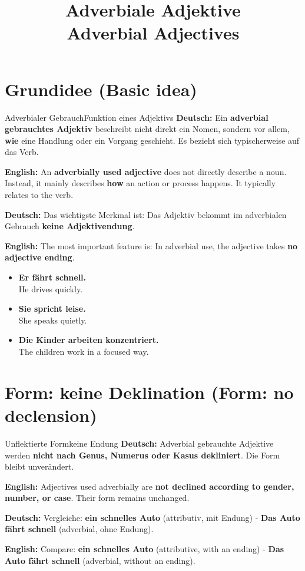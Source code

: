 \documentclass[a4paper,11pt]{article}
\title{Adverbiale Adjektive\\\large\textnormal{Adverbial Adjectives}}
\date{}
\newcommand{\GermanText}[1]{\textbf{Deutsch: }#1\par}
\newcommand{\EnglishText}[1]{{\small\color{SoftGray}\textbf{English: }#1\par}}
\newcommand{\ExampleItem}[2]{\item \textbf{#1}\\{\small\color{SoftGray}#2}}
\begin{document}
    \maketitle
    \tableofcontents
    \newpage

    \section{Grundidee \textnormal{(Basic idea)}}

        \begin{grammarentry}{Adverbialer Gebrauch}{Funktion eines Adjektivs}
            \GermanText{Ein \textbf{adverbial gebrauchtes Adjektiv} beschreibt nicht direkt ein Nomen, sondern vor allem, \textbf{wie} eine Handlung oder ein Vorgang geschieht. Es bezieht sich typischerweise auf das Verb.}
            \EnglishText{An \textbf{adverbially used adjective} does not directly describe a noun. Instead, it mainly describes \textbf{how} an action or process happens. It typically relates to the verb.}

            \GermanText{Das wichtigste Merkmal ist: Das Adjektiv bekommt im adverbialen Gebrauch \textbf{keine Adjektivendung}.}
            \EnglishText{The most important feature is: In adverbial use, the adjective takes \textbf{no adjective ending}.}
        \end{grammarentry}

        \begin{exbox}
            \begin{itemize}
                \ExampleItem{Er fährt schnell.}{He drives quickly.}
                \ExampleItem{Sie spricht leise.}{She speaks quietly.}
                \ExampleItem{Die Kinder arbeiten konzentriert.}{The children work in a focused way.}
            \end{itemize}
        \end{exbox}

    \section{Form: keine Deklination \textnormal{(Form: no declension)}}

        \begin{grammarentry}{Unflektierte Form}{keine Endung}
            \GermanText{Adverbial gebrauchte Adjektive werden \textbf{nicht nach Genus, Numerus oder Kasus dekliniert}. Die Form bleibt unverändert.}
            \EnglishText{Adjectives used adverbially are \textbf{not declined according to gender, number, or case}. Their form remains unchanged.}

            \GermanText{Vergleiche: \textbf{ein schnelles Auto} (attributiv, mit Endung) - \textbf{Das Auto fährt schnell} (adverbial, ohne Endung).}
            \EnglishText{Compare: \textbf{ein schnelles Auto} (attributive, with an ending) - \textbf{Das Auto fährt schnell} (adverbial, without an ending).}
        \end{grammarentry}
\end{document}
